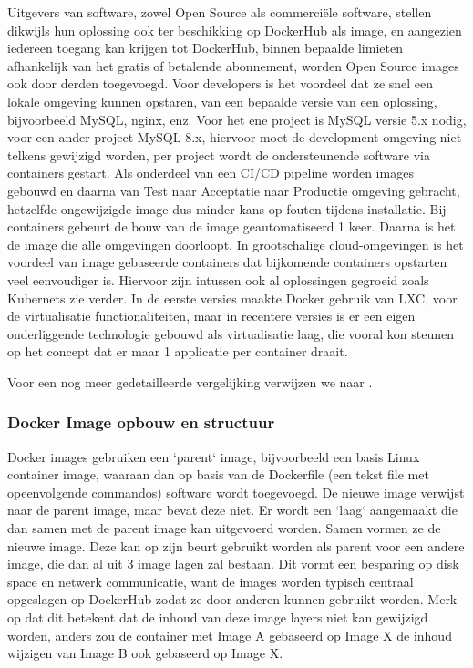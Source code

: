 Uitgevers van software, zowel Open Source als commerciële software, stellen dikwijls hun oplossing ook ter beschikking op DockerHub als image, en aangezien iedereen toegang kan krijgen tot DockerHub, binnen bepaalde limieten afhankelijk van het gratis of betalende abonnement, worden Open Source images ook door derden toegevoegd.
\newline
Voor developers is het voordeel dat ze snel een lokale omgeving kunnen opstaren, van een bepaalde versie van een oplossing, bijvoorbeeld MySQL, nginx, enz. Voor het ene project is MySQL versie 5.x nodig, voor een ander project MySQL 8.x, hiervoor moet de development omgeving niet telkens gewijzigd worden, per project wordt de ondersteunende software via containers gestart.
\newline
Als onderdeel van een CI/CD pipeline worden images gebouwd en daarna van Test naar Acceptatie naar Productie omgeving gebracht, hetzelfde ongewijzigde image dus minder kans op fouten tijdens installatie. Bij containers gebeurt de bouw van de image geautomatiseerd 1 keer. Daarna is het de image die alle omgevingen doorloopt.
\newline
In grootschalige cloud-omgevingen is het voordeel van image gebaseerde containers dat bijkomende containers opstarten veel eenvoudiger is. Hiervoor zijn intussen ook al oplossingen gegroeid zoals Kubernets zie verder.
\newline
In de eerste versies maakte Docker gebruik van LXC, voor de virtualisatie functionaliteiten, maar in recentere versies is er een eigen onderliggende technologie gebouwd als virtualisatie laag, die vooral kon steunen op het concept dat er maar 1 applicatie per container draait. 
\newline
\newline

Voor een nog meer gedetailleerde vergelijking verwijzen we naar \textcite{Tunggal2023}.

\subsubsection{Docker Image opbouw en structuur}
Docker images gebruiken een `parent` image, bijvoorbeeld een basis Linux container image, waaraan dan op basis van de Dockerfile (een tekst file met opeenvolgende commandos) software wordt toegevoegd. De nieuwe image verwijst naar de parent image, maar bevat deze niet. Er wordt een `laag` aangemaakt die dan samen met de parent image kan uitgevoerd worden. Samen vormen ze de nieuwe image.
Deze kan op zijn beurt gebruikt worden als parent voor een andere image, die dan al uit 3 image lagen zal bestaan. Dit vormt een besparing op disk space en netwerk communicatie, want de images worden typisch centraal opgeslagen op DockerHub zodat ze door anderen kunnen gebruikt worden.
Merk op dat dit betekent dat de inhoud van deze image layers niet kan gewijzigd worden, anders zou de container met Image A gebaseerd op Image X de inhoud wijzigen van Image B ook gebaseerd op Image X. 

